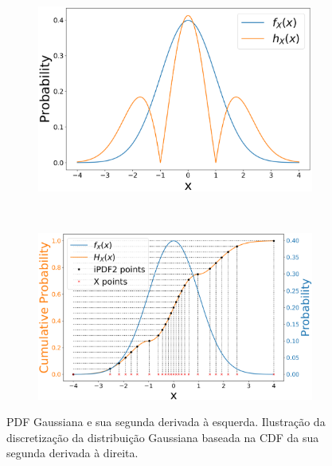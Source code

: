 \begin{figure}[ht]
	\centering
	\begin{subfigure}[b]{0.44\textwidth}
		\centering 
		\includegraphics[width=\textwidth]{./figuras/ddpdf1.pdf}
		\caption{}
		\label{fig:ddPDF1}
	\end{subfigure}
	\hfill
	~ %
	\begin{subfigure}[b]{0.47\textwidth}
		\centering 
		\includegraphics[width=\textwidth]{./figuras/ddpdf2.pdf}
		\caption{}
		\label{fig:ddPDF2}
	\end{subfigure}
	
	\caption{PDF Gaussiana e sua segunda derivada à esquerda. Ilustração da discretização da distribuição Gaussiana baseada na CDF da sua segunda derivada à direita.}
	\label{fig:ddPDF}
\end{figure}

